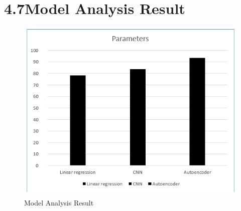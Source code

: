\documentclass[oneside,a4paper,12pt]{book}
\begin{document}
\section*{4.7\hspace*{10pt}Model Analysis Result}
\begin{Center}
\begin{figure}[H]
	\begin{Center}
		\includegraphics[width=\linewidth]{graph.png}
		\caption{Model Analysis Result}
		\label{fig:EndorsersCommitters_Role}
	\end{Center}
\end{figure}
\end{Center}\par



















\newpage

\vspace{\baselineskip}
\vspace{\baselineskip}

\vspace{\baselineskip}
\end{document}
